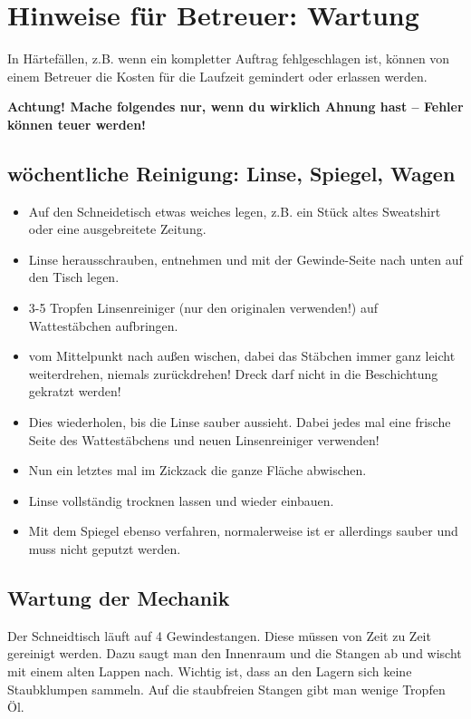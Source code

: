 \documentclass{\basedir/fablab-document}
\begin{document}
\newpage
\section{Hinweise für Betreuer: Wartung}
In Härtefällen, z.B. wenn ein kompletter Auftrag fehlgeschlagen ist, können von einem Betreuer die Kosten für die Laufzeit gemindert oder erlassen werden.

\textbf{Achtung! Mache folgendes nur, wenn du wirklich Ahnung hast -- Fehler können teuer werden!}

\subsection{wöchentliche Reinigung: Linse, Spiegel, Wagen}
\begin{itemize}
\label{linsenreinigung}
 \item Auf den Schneidetisch etwas weiches legen, z.B. ein Stück altes Sweatshirt oder eine ausgebreitete Zeitung.
 \item Linse herausschrauben, entnehmen und mit der Gewinde-Seite nach unten auf den Tisch legen.
 \item 3-5 Tropfen Linsenreiniger (nur den originalen verwenden!) auf Wattestäbchen aufbringen.
 \item vom Mittelpunkt nach außen wischen, dabei das Stäbchen immer ganz leicht weiterdrehen, niemals zurückdrehen! Dreck darf nicht in die Beschichtung gekratzt werden!
 \item Dies wiederholen, bis die Linse sauber aussieht. Dabei jedes mal eine frische Seite des Wattestäbchens und neuen Linsenreiniger verwenden!
 \item Nun ein letztes mal im Zickzack die ganze Fläche abwischen.
 \item Linse vollständig trocknen lassen und wieder einbauen.
 \item Mit dem Spiegel ebenso verfahren, normalerweise ist er allerdings sauber und muss nicht geputzt werden.
\end{itemize}

\subsection{Wartung der Mechanik}
Der Schneidtisch läuft auf 4 Gewindestangen. Diese müssen von Zeit zu Zeit gereinigt werden. Dazu saugt man den Innenraum und die Stangen ab und wischt mit einem alten Lappen nach. Wichtig ist, dass an den Lagern sich keine Staubklumpen sammeln. Auf die staubfreien Stangen gibt man wenige Tropfen Öl.
\end{document}
